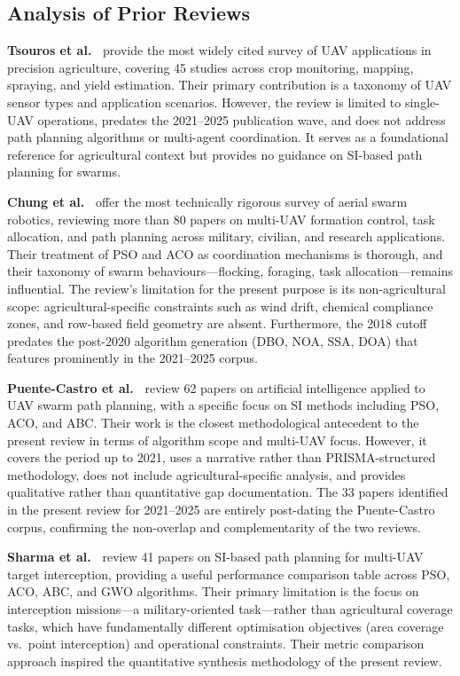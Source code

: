 \documentclass[review,3p,times]{elsarticle}
\begin{document}
\subsection*{Analysis of Prior Reviews}

\textbf{Tsouros et al.\ \cite{tsouros2019}} provide the most widely cited survey of UAV applications in precision agriculture, covering 45 studies across crop monitoring, mapping, spraying, and yield estimation. Their primary contribution is a taxonomy of UAV sensor types and application scenarios. However, the review is limited to single-UAV operations, predates the 2021--2025 publication wave, and does not address path planning algorithms or multi-agent coordination. It serves as a foundational reference for agricultural context but provides no guidance on SI-based path planning for swarms.

\textbf{Chung et al.\ \cite{chung2018}} offer the most technically rigorous survey of aerial swarm robotics, reviewing more than 80 papers on multi-UAV formation control, task allocation, and path planning across military, civilian, and research applications. Their treatment of PSO and ACO as coordination mechanisms is thorough, and their taxonomy of swarm behaviours---flocking, foraging, task allocation---remains influential. The review's limitation for the present purpose is its non-agricultural scope: agricultural-specific constraints such as wind drift, chemical compliance zones, and row-based field geometry are absent. Furthermore, the 2018 cutoff predates the post-2020 algorithm generation (DBO, NOA, SSA, DOA) that features prominently in the 2021--2025 corpus.

\textbf{Puente-Castro et al.\ \cite{puente2022}} review 62 papers on artificial intelligence applied to UAV swarm path planning, with a specific focus on SI methods including PSO, ACO, and ABC. Their work is the closest methodological antecedent to the present review in terms of algorithm scope and multi-UAV focus. However, it covers the period up to 2021, uses a narrative rather than PRISMA-structured methodology, does not include agricultural-specific analysis, and provides qualitative rather than quantitative gap documentation. The 33 papers identified in the present review for 2021--2025 are entirely post-dating the Puente-Castro corpus, confirming the non-overlap and complementarity of the two reviews.

\textbf{Sharma et al.\ \cite{sharma2022}} review 41 papers on SI-based path planning for multi-UAV target interception, providing a useful performance comparison table across PSO, ACO, ABC, and GWO algorithms. Their primary limitation is the focus on interception missions---a military-oriented task---rather than agricultural coverage tasks, which have fundamentally different optimisation objectives (area coverage vs.\ point interception) and operational constraints. Their metric comparison approach inspired the quantitative synthesis methodology of the present review.
\end{document}
